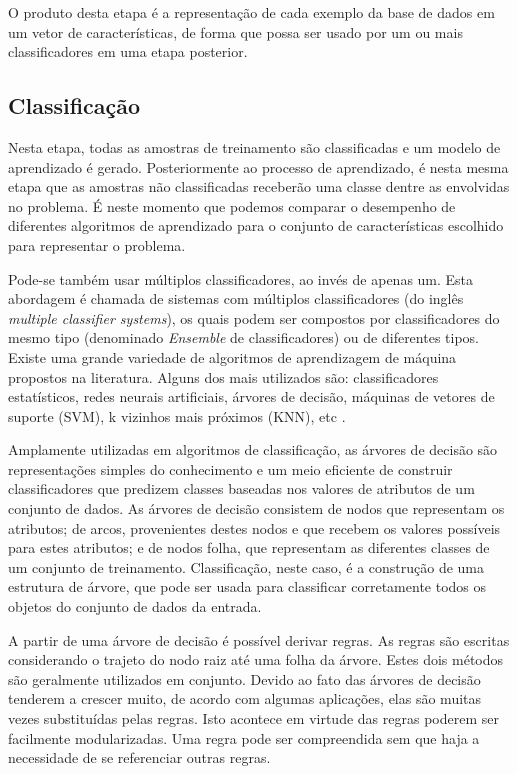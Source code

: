O produto desta etapa é a representação de cada exemplo da base de dados em um vetor de características, de forma que possa ser usado por um ou mais classificadores em uma etapa posterior.


\subsection{Classificação}\label{sec:classificacao}

Nesta etapa, todas as amostras de treinamento são classificadas e um modelo de aprendizado é gerado. Posteriormente ao processo de aprendizado, é nesta mesma etapa que as amostras não classificadas receberão uma classe dentre as envolvidas no problema. É neste momento que podemos comparar o desempenho de diferentes algoritmos de aprendizado para o conjunto de características escolhido para representar o problema.

Pode-se também usar múltiplos classificadores, ao invés de apenas um. Esta abordagem é chamada de sistemas com múltiplos classificadores (do inglês \textit{multiple classifier systems}), os quais podem ser compostos por classificadores do mesmo tipo (denominado \textit{Ensemble} de classificadores) ou de diferentes tipos. Existe uma grande variedade de algoritmos de aprendizagem de máquina propostos na literatura. Alguns dos mais utilizados são: classificadores estatísticos, redes neurais artificiais, árvores de decisão, máquinas de vetores de suporte (SVM), k vizinhos mais próximos (KNN), etc \cite{jain:1989}.

Amplamente utilizadas em algoritmos de classificação, as árvores de decisão são representações simples do conhecimento e um meio eficiente de construir classificadores que predizem classes baseadas nos valores de atributos de um conjunto de dados. As árvores de decisão consistem de nodos que representam os atributos; de arcos, provenientes destes nodos e que recebem os valores possíveis para estes atributos; e de nodos folha, que representam as diferentes classes de um conjunto de treinamento. Classificação, neste caso, é a construção de uma estrutura de árvore, que pode ser usada para classificar corretamente todos os objetos do conjunto de dados da entrada.

A partir de uma árvore de decisão é possível derivar regras. As regras são escritas considerando o trajeto do nodo raiz até uma folha da árvore. Estes dois métodos são geralmente utilizados em conjunto. Devido ao fato das árvores de decisão tenderem a crescer muito, de acordo com algumas aplicações, elas são muitas vezes substituídas pelas regras. Isto acontece em virtude das regras poderem ser facilmente modularizadas. Uma regra pode ser compreendida sem que haja a necessidade de se referenciar outras regras.

